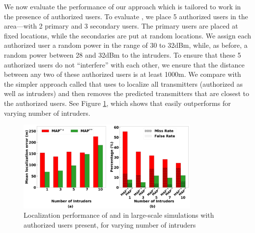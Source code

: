   We now evaluate
the performance of our \ouralgoss approach which is tailored to work
in the presence of authorized users. To evaluate \ouralgoss, we place
5 authorized users in the area---with 2 primary and 3 secondary users.
The primary users are placed at fixed locations, while the secondaries
are put at random locations. We assign each authorized user a random
power in the range of 30 to 32dBm, while, as before, a random power
between 28 and 32dBm to the intruders. To ensure that these 5
authorized users do not ``interfere'' with each other, we ensure that
the distance between any two of these authorized users is at least
1000m.
We compare \ouralgoss with the simpler approach called \ouralgos that
uses \ouralgo to localize all transmitters (authorized as well as
intruders) and then removes the predicted transmitters that are
closest to the authorized users.
See Figure \ref{fig:shared-spectrum}, which shows that \ouralgoss easily
outperforms \ouralgos for varying number of intruders. 

\begin{figure}[ht]
	\centering
	\includegraphics[width=0.8\textwidth]{chapters/ipsn/figures/splat-vary-numauthorized.png}
	\caption{Localization performance of \ouralgos and \ouralgoss in large-scale simulations with authorized users present, for varying number of intruders}
	\label{fig:shared-spectrum}
\end{figure}
